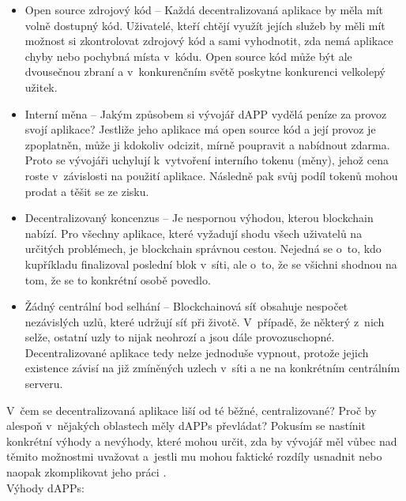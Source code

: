 \begin{itemize}
\item Open source zdrojový kód -- Každá decentralizovaná aplikace by měla mít volně dostupný kód. Uživatelé, kteří chtějí využít jejích služeb by měli mít možnost si zkontrolovat zdrojový kód a sami vyhodnotit, zda nemá aplikace chyby nebo pochybná místa v~kódu. Open source kód může být ale dvousečnou zbraní a v~konkurenčním světě poskytne konkurenci velkolepý užitek.
\item Interní měna -- Jakým způsobem si vývojář dAPP vydělá peníze za provoz svojí aplikace? Jestliže jeho aplikace má open source kód a její provoz je zpoplatněn, může ji kdokoliv odcizit, mírně poupravit a nabídnout zdarma. Proto se vývojáři uchylují k~vytvoření interního tokenu (měny), jehož cena roste v~závislosti na použití aplikace. Následně pak svůj podíl tokenů mohou prodat a těšit se ze zisku.
\item Decentralizovaný koncenzus -- Je nespornou výhodou, kterou blockchain nabízí. Pro všechny aplikace, které vyžadují shodu všech uživatelů na určitých problémech, je blockchain správnou cestou. Nejedná se o~to, kdo kupříkladu finalizoval poslední blok v~síti, ale o~to, že se všichni shodnou na tom, že se to konkrétní osobě povedlo.
\item Žádný centrální bod selhání -- Blockchainová síť obsahuje nespočet nezávislých uzlů, které udržují síť při životě. V~případě, že některý z~nich selže, ostatní uzly to nijak neohrozí a jsou dále provozuschopné. Decentralizované aplikace tedy nelze jednoduše vypnout, protože jejich existence závisí na již zmíněných uzlech v~síti a ne na konkrétním centrálním serveru.
\end{itemize}

V~čem se decentralizovaná aplikace liší od té běžné, centralizované? Proč by alespoň v~nějakých oblastech měly dAPPs převládat? Pokusím se nastínit konkrétní výhody a nevýhody, které mohou určit, zda by vývojář měl vůbec nad těmito možnostmi uvažovat a~jestli mu mohou faktické rozdíly usnadnit nebo naopak zkomplikovat jeho práci \cite{dappProsCons}. \\

Výhody dAPPs:

